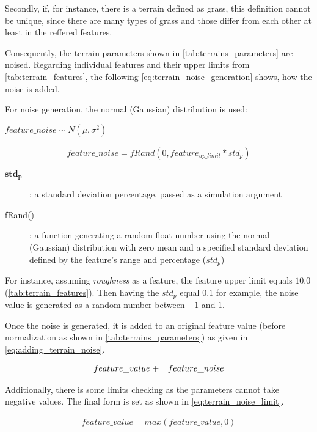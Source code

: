 Secondly, if, for instance, there is a terrain defined as grass, this definition cannot be unique, since there are many types of grass and those differ from each other at least in the reffered features.

Consequently, the terrain parameters shown in \cref{tab:terrains_parameters} are noised. Regarding individual features and their upper limits from \cref{tab:terrain_features}, the following \cref{eq:terrain_noise_generation} shows, how the noise is added.

For noise generation, the normal (Gaussian) distribution is used: 
\begin{center}
$ feature\_noise \sim N(\mu, \sigma^2) $
\end{center}

\begin{align} \label{eq:terrain_noise_generation}
feature\_noise = fRand(0, feature_{up\_limit}*std_p)
\end{align}

\begin{description}
\item[$ \boldsymbol{std_p} $] : a standard deviation percentage, passed as a simulation argument
\item[fRand()] : a function generating a random float number using the normal (Gaussian) distribution with zero mean and a specified standard deviation defined by the feature's range and percentage ($ std_p $)
\end{description}

For instance, assuming \textit{roughness} as a feature, the feature upper limit equals $ 10.0 $ (\cref{tab:terrain_features}). Then having the $ std_p $ equal $ 0.1 $ for example, the noise value is generated as a random number between $ -1 $ and $ 1 $.

Once the noise is generated, it is added to an original feature value (before normalization as shown in \cref{tab:terrains_parameters}) as given in \cref{eq:adding_terrain_noise}.

\begin{align} \label{eq:adding_terrain_noise}
feature\_value \mathrel{+}= feature\_noise
\end{align}

Additionally, there is some limits checking as the parameters cannot take negative values. The final form is set as shown in \cref{eq:terrain_noise_limit}.

\begin{align} \label{eq:terrain_noise_limit}
feature\_value = max(feature\_value, 0)
\end{align}


